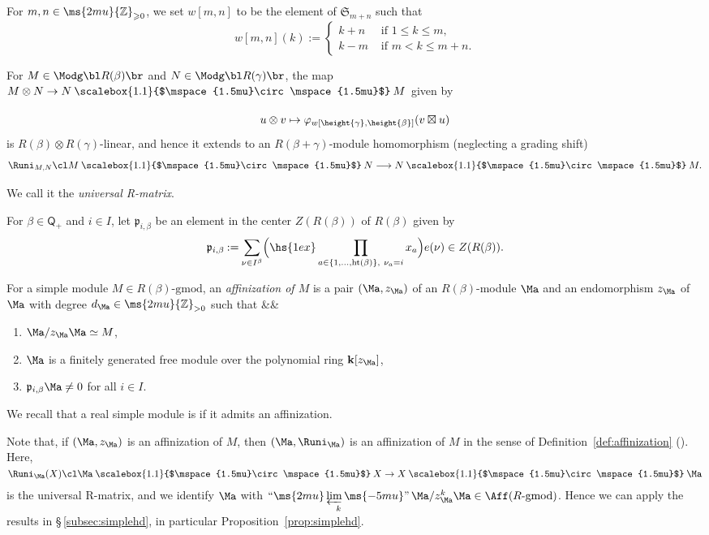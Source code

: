 \documentclass[12pt,leqno]{amsart}%
\renewcommand{\le}{\leqslant}
\renewcommand{\ge}{\geqslant}
\theoremstyle{plain}
\theoremstyle{definition}
\newcommand{\Z}{\ms{2mu}{\mathbb Z}}
\newcommand{\seteq}{\mathbin{:=}}
\newcommand{\gmod}{\text{-}\mathrm{gmod}}
\newcommand{\conv}[1][]{
\underset{\raisebox{.5ex}{$\scriptstyle{#1}$}}{\mathbin{\scalebox{1.1}{$\mspace{1.5mu}\circ\mspace{1.5mu}$}}}}
\newcommand{\rlQ}{\mathsf{Q}}   %
\newcommand{\sg}{\mathfrak{S}}   %
\newcommand{\bR}{\mathbf{k}} 		%
\newcommand{\Ht}{\mathrm{ht}} 		%
\newcommand{\etens}{\boxtimes}
\newcommand{\proolim}[1][]{\mathop{\text{``}\ms{2mu}\varprojlim\ms{-5mu}\text{''}}\limits_{#1}}
\numberwithin{equation}{section}
\begin{document}
For $m,n \in \Z_{\ge 0}$, we set $w[m,n]$ to be the element of $\sg_{m+n}$ such that
$$
w[m,n](k) \seteq
\left\{
\begin{array}{ll}
 k+n & \text{ if } 1 \le k \le m,  \\
 k-m & \text{ if } m < k \le m+n.
\end{array}
\right.
$$


For $M\in \Modg\bl R(\beta)\br $ and $N\in \Modg\bl R(\gamma)\br$,
the map $M \otimes N \rightarrow N \conv M$ given by
 $$u \otimes v \mapsto \varphi_{w[\height{\gamma},\height{\beta}]}(v \etens u)$$
is
$R(\beta)\otimes R(\gamma)$-linear, and hence
it extends to an $R(\beta+\gamma)$-module homomorphism (neglecting a grading shift)
$$
\Runi_{M,N}\cl  M\conv N \longrightarrow N \conv M.
$$
We call it the {\em universal R-matrix}.

\medskip
For $\beta \in \rlQ_+$ and $i\in I$,  let $\mathfrak{p}_{i, \beta}$ be an element in the center $Z(R(\beta))$ of $R(\beta)$ given by
\begin{align} \label{Eq: def of p}
\mathfrak{p}_{i, \beta}  \seteq \sum_{\nu \in I^\beta} \Bigl(\hs{1ex}  \prod_{a \in \{1, \ldots, \Ht(\beta) \},\ \nu_a=i} x_a \Bigr) e(\nu)\in Z(R(\beta)).
\end{align}

\Def[\cite{KP18}]\label{def:affinization1}
For a simple module $M\in R(\beta)\gmod$,
an  \emph{affinization of $M$} is a pair  $(\Ma,z_{\Ma})$
of  an $R(\beta)$-module $\Ma$ and an endomorphism $z_{\Ma}$ of $\Ma$
with degree $d_{\Ma} \in \Z_{>0}$ such that 
\eq \label{eq:oldaff}
&&\hs{2ex}\parbox{75ex}{
\begin{enumerate}[\rm (i)]
\item $\Ma / z_{\Ma} \Ma \simeq M$,
\item $\Ma$ is a finitely generated free module over the polynomial ring $\bR[z_{\Ma}]$,
\item $\mathfrak{p}_{i,\beta} \Ma \ne 0$ for all $i\in I$.\label{it:nonzeroP}
\end{enumerate}
}\eneq

We recall that a real simple module is {\em \afr} if it admits an affinization.
\edf


Note that, if $(\Ma,z_{\Ma})$ is an affinization of $M$,
then $(\Ma,\Runi_{\Ma})$ is an affinization of $M$ in the sense of
Definition~\ref{def:affinization} (\cite{KP18}). Here, $\Runi_{\Ma}(X)\cl \Ma\conv X\to X\conv\Ma$ is the universal R-matrix,
and 
we identify $\Ma$ with $\proolim[{k}]\Ma/z_\Ma^k\Ma\in\Aff(R\gmod)$. 
Hence we can apply the results in \S\,\ref{subsec:simplehd}, in particular Proposition~\ref{prop:simplehd}.
\end{document}
